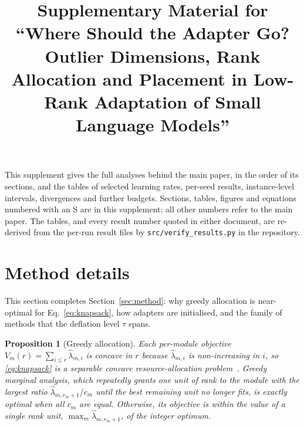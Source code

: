 \documentclass[conference,onecolumn]{IEEEtran}
\newtheorem{proposition}{Proposition}
\begin{document}
\title{Supplementary Material for\\ ``Where Should the Adapter Go? Outlier
Dimensions, Rank Allocation and Placement in Low-Rank Adaptation of Small
Language Models''}

\author{
\and
{}
}

\maketitle

\noindent This supplement gives the full analyses behind the main paper, in the
order of its sections, and the tables of selected learning rates, per-seed
results, instance-level intervals, divergences and further budgets. Sections,
tables, figures and equations numbered with an S are in this supplement; all
other numbers refer to the main paper. The tables, and every result number quoted
in either document, are re-derived from the per-run result files by
\texttt{src/verify\_results.py} in the repository.

\section{Method details}
\label{sup:method}
This section completes Section~\ref{sec:method}: why greedy allocation is near-optimal for Eq.~\eqref{eq:knapsack}, how adapters are initialised, and the family of methods that the deflation level $\tau$ spans.

\begin{proposition}[Greedy allocation]
\label{prop:greedy}
Each per-module objective $V_m(r) = \sum_{i \le r}\hat{\lambda}_{m,i}$ is concave
in $r$ because $\hat{\lambda}_{m,i}$ is non-increasing in $i$, so
\eqref{eq:knapsack} is a separable concave resource-allocation
problem~\cite{fox1966discrete,federgruen1986allocation}. Greedy marginal
analysis, which repeatedly grants one unit of rank to the module with the
largest ratio $\hat{\lambda}_{m,r_m+1}/c_m$ until the best remaining unit no
longer fits, is exactly optimal when all $c_m$ are equal. Otherwise, its
objective is within the value of a single rank unit,
$\max_m \hat{\lambda}_{m,r_m+1}$, of the integer optimum.
\end{proposition}
\end{document}
